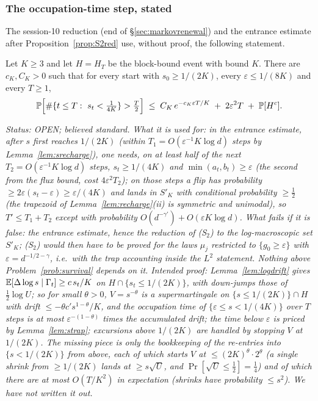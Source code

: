\subsubsection{The occupation-time step, stated}\label{sec:s13occ}

The session-10 reduction (end of \S\ref{sec:markovrenewal}) and the
entrance estimate after Proposition~\ref{prop:S2red} use, without
proof, the following statement.

\begin{lemma}\label{lem:occupation}
Let $K\ge3$ and let $H=H_T$ be the block-bound event with bound $K$.
There are $c_K,C_K>0$ such that for every start with
$s_0\ge1/(2K)$, every $\varepsilon\le1/(8K)$ and every $T\ge1$,
\[
\Pr\Bigl[\#\{t\le T:\ s_t<\tfrac1{4K}\}>\tfrac T2\Bigr]
\;\le\;C_K\,e^{-c_K\varepsilon T/K}\;+\;2\varepsilon^2T\;+\;\Pr[H^c].
\]
\end{lemma}

\emph{Status: OPEN; believed standard.  What it is used for: in the
entrance estimate, after $s$ first reaches $1/(2K)$ (within
$T_1=O(\varepsilon^{-1}K\log d)$ steps by Lemma~\ref{lem:srecharge}),
one needs, on at least half of the next $T_2=O(\varepsilon^{-1}K\log d)$
steps, $s_t\ge1/(4K)$ and $\min(a_t,b_t)\ge\varepsilon$ (the second
from the flux bound, cost $4\varepsilon^2T_2$); on those steps a flip
has probability $\ge2\varepsilon(s_t-\varepsilon)\ge\varepsilon/(4K)$
and lands in $S'_K$ with conditional probability $\ge\tfrac12$
(the trapezoid of Lemma~\ref{lem:recharge}(ii) is symmetric and
unimodal), so $T'\le T_1+T_2$ except with probability
$O(d^{-\gamma'})+O(\varepsilon K\log d)$.  What fails if it is false:
the entrance estimate, hence the reduction of (S$_2$) to the
log-macroscopic set $S'_K$; (S$_2$) would then have to be proved for
the laws $\mu_j$ restricted to $\{g_0\ge\varepsilon\}$ with
$\varepsilon=d^{-1/2-\gamma}$, i.e.\ with the trap accounting inside
the $L^2$ statement.  Nothing above Problem~\ref{prob:survival}
depends on it.  Intended proof: Lemma~\ref{lem:logdrift} gives
$\mathbb{E}[\Delta\log s\mid\Gamma_t]\ge c\,s_t/K$ on $H\cap\{s_t\le1/(2K)\}$,
with down-jumps those of $\tfrac12\log U$; so for small $\theta>0$,
$V=s^{-\theta}$ is a supermartingale on $\{s\le1/(2K)\}\cap H$ with
drift $\le-\theta c's^{1-\theta}/K$, and the occupation time of
$\{\varepsilon\le s<1/(4K)\}$ over $T$ steps is at most
$\varepsilon^{-(1-\theta)}$ times the accumulated drift; the time
below $\varepsilon$ is priced by Lemma~\ref{lem:strap}; excursions
above $1/(2K)$ are handled by stopping $V$ at $1/(2K)$.  The missing
piece is only the bookkeeping of the re-entries into
$\{s<1/(2K)\}$ from above, each of which starts $V$ at
$\le(2K)^\theta\cdot2^\theta$ (a single shrink from $\ge1/(2K)$
lands at $\ge s\sqrt U$, and $\Pr[\sqrt U\le\tfrac12]=\tfrac14$) and
of which there are at most $O(T/K^2)$ in expectation (shrinks have
probability $\le s^2$).  We have not written it out.}

